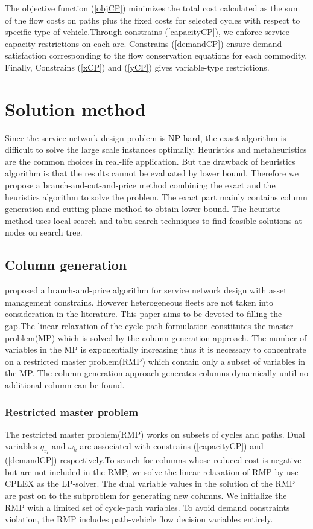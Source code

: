 \documentclass[11pt,nonblindrev,fleqn]{article}
\begin{document}
The objective function (\ref{objCP}) minimizes the total cost calculated as the sum of the flow costs on paths plus the fixed costs for selected cycles with respect to specific type of vehicle.Through constrains (\ref{capacityCP}), we enforce service capacity restrictions on each arc. Constrains (\ref{demandCP}) ensure demand satisfaction corresponding to the flow conservation equations for each commodity.  Finally, Constrains (\ref{xCP}) and (\ref{yCP}) gives variable-type restrictions.

\section{Solution method}
Since the service network design problem is NP-hard, the exact algorithm is difficult to solve the large scale instances optimally. Heuristics and metaheuristics are the common choices in real-life application. But the drawback of heuristics algorithm is that the results cannot be evaluated by lower bound. Therefore we propose a branch-and-cut-and-price method combining the exact and the heuristics algorithm to solve the problem. The exact part mainly contains column generation and cutting plane method to obtain lower bound. The heuristic method uses local search and tabu search techniques to find feasible solutions at nodes on search tree.

\subsection{Column generation}
\cite{Andersen2011Branch} proposed a branch-and-price algorithm for service network design with asset management constrains. However heterogeneous fleets are not taken into consideration in the literature. This paper aims to be devoted to filling the gap.The linear relaxation of the cycle-path formulation constitutes the master problem(MP) which is solved by the column generation approach. The number of variables in the MP is exponentially increasing thus it is necessary to concentrate on a restricted master problem(RMP) which contain only a subset of variables in the MP. The column generation approach generates columns dynamically until no additional column can be found.

\subsubsection{Restricted master problem}
The restricted master problem(RMP) works on subsets of cycles and paths. Dual variables $\eta_{ij}$ and $\omega_k$ are associated with constrains (\ref{capacityCP}) and (\ref{demandCP}) respectively.To search for columns whose reduced cost is negative but are not included in the RMP, we solve the linear relaxation of RMP by use CPLEX as the LP-solver. The dual variable values in the solution of the RMP are past on to the subproblem for generating new columns. We initialize the RMP with a limited set of cycle-path variables. To avoid demand constraints violation, the RMP includes path-vehicle flow decision variables entirely.
\end{document}

